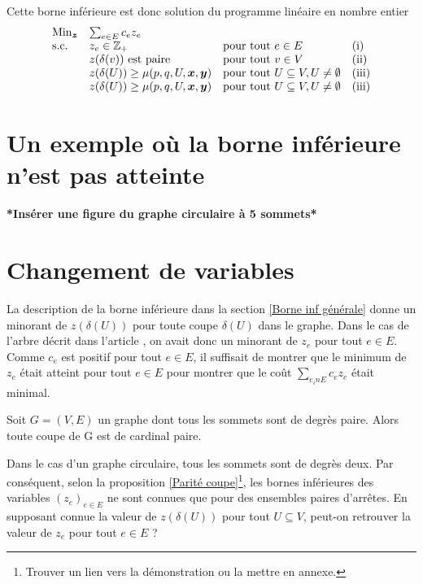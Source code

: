 \documentclass[twoside,11pt,openany,a4paper]{rapport}
\begin{document}
Cette borne inférieure est donc solution du programme linéaire en nombre entier
\[
\begin{array}{llll}
  \mbox{Min}_{\boldsymbol{z}} &\sum_{e \in E} c_ez_e & & \\
  \mbox{s.c.}       &z_e \in \mathbb{Z}_+ &\mbox{pour tout } e \in E &\mbox{(i)} \\
                    &z(\delta(v)) \mbox{ est paire} &\mbox{pour tout } v \in V &\mbox{(ii)} \\
                    &z(\delta(U)) \ge \mu(p,q,U,\boldsymbol{x},\boldsymbol{y}) &\mbox{pour tout } U \subseteq V, U \ne \emptyset &\mbox{(iii)} \\
                    &z(\delta(U)) \ge \mu(p,q,U,\boldsymbol{x},\boldsymbol{y}) &\mbox{pour tout } U \subseteq V, U \ne \emptyset &\mbox{(iii)}
\end{array}
\]

\section{Un exemple où la borne inférieure n'est pas atteinte}

\textbf{*Insérer une figure du graphe circulaire à 5 sommets*}

\section{Changement de variables}

La description de la borne inférieure dans la section \ref{Borne inf générale} donne un minorant de $z(\delta(U))$ pour toute coupe $\delta(U)$ dans le graphe. Dans le cas de l'arbre décrit dans l'article \cite{Benchimol2011}, on avait donc un minorant de $z_e$ pour tout $e \in E$. Comme $c_e$ est positif pour tout $e\in E$, il suffisait de montrer que le minimum de $z_e$ était atteint pour tout $e \in E$ pour montrer que le coût $\sum_{e _in E}c_ez_e$ était minimal.

\begin{prop}\label{Parité coupe}
Soit $G=(V,E)$ un graphe dont tous les sommets sont de degrès paire. Alors toute coupe de G est de cardinal paire.
\end{prop}

Dans le cas d'un graphe circulaire, tous les sommets sont de degrès deux. Par conséquent, selon la proposition \ref{Parité coupe}\footnote{Trouver un lien vers la démonstration ou la mettre en annexe.}, les bornes inférieures des variables $(z_e)_{e \in E}$ ne sont connues que pour des ensembles paires d'arrêtes. En supposant connue la valeur de $z(\delta(U))$ pour tout $U \subseteq V$, peut-on retrouver la valeur de $z_e$ pour tout $e \in E$ ?
\end{document}
